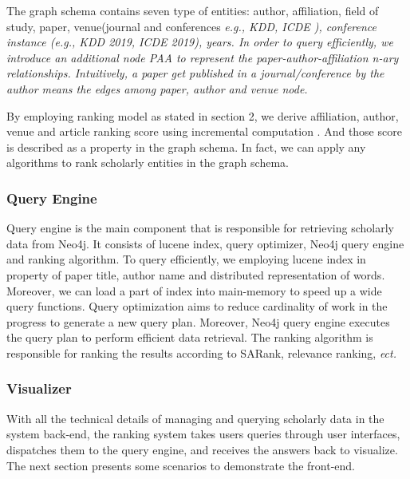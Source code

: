 \par
The graph schema contains seven type of entities: author, affiliation, field of study, paper, venue(journal and conferences \itshape e.g., \upshape KDD, ICDE ), conference instance (\itshape e.g., \upshape KDD 2019, ICDE 2019), years. In order to query efficiently, we introduce an additional node PAA to represent the paper-author-affiliation n-ary relationships. Intuitively, a paper get published in a journal/conference by the author means the edges among paper, author and venue node.

\par
By employing ranking model as stated in section 2, we derive affiliation, author, venue and article ranking score using incremental computation \cite{ma2018query}. And those score is described as a property in the graph schema. In fact, we can apply any algorithms to rank scholarly entities in the graph schema.


\subsubsection{Query Engine}
Query engine is the main component that is responsible for retrieving scholarly data from Neo4j. It consists of lucene index, query optimizer, Neo4j query engine and ranking algorithm. To query efficiently, we employing lucene index in property of paper title, author name and distributed representation of words. Moreover, we can load a part of index into main-memory to speed up a wide query functions. 
Query optimization aims to reduce cardinality of work in the progress to generate a new query plan. Moreover, Neo4j query engine executes the query plan to perform efficient data retrieval. The ranking algorithm is responsible for ranking the results according to SARank, relevance ranking,  \itshape ect. \upshape


\subsubsection{Visualizer}
With all the technical details of managing and querying scholarly data in the system back-end, the ranking system takes users queries through user interfaces, dispatches them to the query engine, and receives the answers back to visualize. The next section presents some scenarios to demonstrate the front-end.



